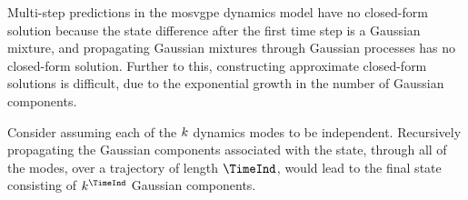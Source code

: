 \documentclass{mimosis-class/mimosis}
\numberwithin{equation}{chapter}
\newcommand{\numData}{\ensuremath{t}}
\newcommand{\modeInd}{\ensuremath{k}}
\newcommand{\ModeInd}{\ensuremath{\MakeUppercase{\modeInd}}}
\newcommand{\singleData}[1]{\ensuremath{#1_{\numData}}}
\newcommand{\mode}[1]{\ensuremath{#1_{\modeInd}}}
\newcommand{\x}{\ensuremath{\mathbf{x}}}
\newcommand{\y}{\ensuremath{y}}
\newcommand{\singleInput}{\ensuremath{\x_{\numData-1}}}
\newcommand{\singleOutput}{\ensuremath{\singleData{\y}}}
\newcommand{\latentFunc}{\ensuremath{f}}
\newcommand{\LatentFunc}{\ensuremath{\mathbf{\latentFunc}}}
\begin{document}
{\newcommand{\expertInducingPrior}{\ensuremath{p(\expertInducingOutput)}}
\newcommand{\expertsInducingPrior}{\ensuremath{p(\expertsInducingOutput)}}
\newcommand{\expertInducingVariational}{\ensuremath{q(\expertInducingOutput)}}
\newcommand{\expertsInducingVariational}{\ensuremath{q(\expertsInducingOutput)}}
\newcommand{\expertsVariational}{\ensuremath{q(\LatentFunc_\numData)}}
\newcommand{\singleExpertGivenInducing}{\ensuremath{p(\singleOutput \mid \expertInducingOutput)}}
\renewcommand{\singleLatentExpertGivenInducing}{\ensuremath{p(\mode{\latentFunc}(\singleInput) \mid \singleInput, \expertInducingOutput)}}

\renewcommand{\expertVariational}{\ensuremath{q(\mode{\latentFunc}(\singleInput) \mid \singleInput)}}

\newcommand{\singleInputMean}{\ensuremath{\hat{\bm\mu}}}
\newcommand{\singleInputCov}{\ensuremath{\hat{\bm\Sigma}}}

Multi-step predictions in the \acrshort{mosvgpe} dynamics model have no closed-form solution  because the state
difference after the first time step is a Gaussian mixture, and
propagating Gaussian mixtures through Gaussian processes has no closed-form solution.
Further to this, constructing approximate closed-form solutions is difficult,
due to the exponential growth in the number of Gaussian components.
\begin{myquote} \label{}
Consider assuming each of the $\ModeInd$ dynamics modes to be independent.
Recursively propagating the Gaussian components associated with the state, through
all of the modes, over a trajectory of length $\TimeInd$, would lead to the final state consisting of
$\ModeInd^{\TimeInd}$ Gaussian components.
\end{myquote}

}
\end{document}
